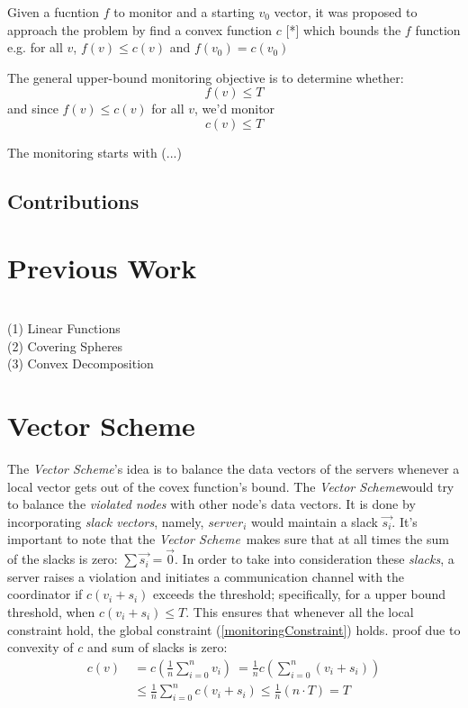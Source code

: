 \documentclass[10pt, conference]{IEEEtran}
\newcommand{\vectorScheme}{\textit{Vector Scheme}}
\begin{document}
Given a fucntion $f$ to monitor and a starting $v_0$ vector, it was proposed to approach the problem by find a convex function $c$ \label{fConvexity} [*] which bounds the $f$ function e.g. for all $v$, $f(v) \leq c(v)$ and $f(v_0)=c(v_0)$

The general upper-bound monitoring objective is to determine whether:
\begin{equation}
\label{functionMonitoringConstraint}
f(v) \leq T
\end{equation}
and since $f(v) \leq c(v)$ for all $v$, we'd monitor 
\begin{equation}
\label{monitoringConstraint}
c(v) \leq T
\end{equation}

The monitoring starts with (...)

\subsection{Contributions}


\section{Previous Work}
 \ \ \  \\
(1) Linear Functions \\
(2) Covering Spheres \\
(3) Convex Decomposition
\section{Vector Scheme}

The \vectorScheme 's idea is to balance the data vectors of the servers whenever a local vector gets out of the covex function's bound. The \vectorScheme would try to balance the \textit{violated nodes} with other node's data vectors. It is done by incorporating \textit{slack vectors}, namely, $server_i$ would maintain a slack $\overrightarrow{s_i}$. It's important to note that the \vectorScheme \  makes sure that at all times the sum of the slacks is zero: $\sum{\overrightarrow{s_i}} = \textstyle \overrightarrow{0}$.
In order to take into consideration these \textit{slacks}, a server raises a violation and initiates a communication channel with the coordinator if $c(v_i+s_i)$ exceeds the threshold; specifically, for a upper bound threshold, when $c(v_i+s_i) \leq T$. This ensures that whenever all the local constraint hold, the global constraint (\ref{monitoringConstraint}) holds. proof due to convexity of $c$ and sum of slacks is zero:
\begin{equation}
\label{vectorSchemeProof}
\begin{aligned}
 c(v)  \
	   &=  c\left(\frac{1}{n} \sum\limits_{i=0}^{n}{v_i}\right)  \
        =  \frac{1}{n} c\left(\sum\limits_{i=0}^{n}{(v_i + s_i)}\right) \\
      &\leq   \frac{1}{n} \sum\limits_{i=0}^{n}{c(v_i + s_i)}
       \leq   \frac{1}{n}(n \cdot T)
       = T
\end{aligned}
\end{equation}
\end{document}
